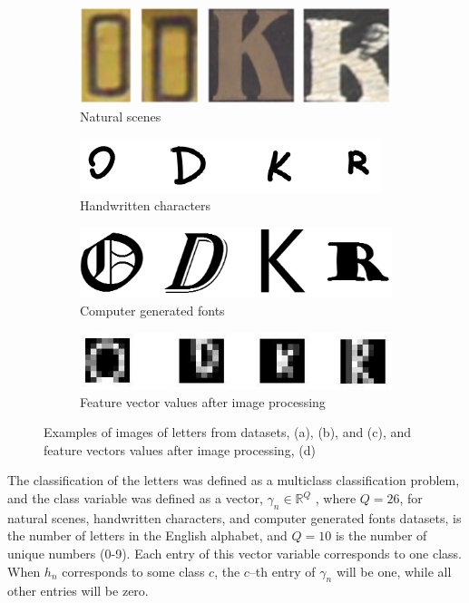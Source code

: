 \documentclass[journal,a4paper,onecolumn,11pt]{IEEEtran}
\begin{document}
\begin{figure}[!h] 
\centering
\begin{subfigure}{.5\textwidth}
  \centering
       \includegraphics[scale=0.5]{natural_images.png}
  \caption{Natural scenes}
    \label{fig:natural_images}
\end{subfigure}%
\begin{subfigure}{.5\textwidth}
\centering
       \includegraphics[scale=.8]{handwritten_char.png}
  \caption{Handwritten characters}
    \label{fig:handwritten_char}
\end{subfigure}
\begin{subfigure}{.5\textwidth}
\centering
       \includegraphics[scale=0.5]{fnt.png}
  \caption{Computer generated fonts}
    \label{fig:fnt}
\end{subfigure}%
\begin{subfigure}{.5\textwidth}
\centering
       \includegraphics[scale=0.6]{processed_char.png}
  \caption{Feature vector values after image processing}
    \label{fig:processed_char}
\end{subfigure}
\caption{Examples of images of letters from datasets, (a), (b), and (c), and feature vectors values after image processing, (d)}
    \label{fig:datasets}
\end{figure}

The classification of the letters was defined as a multiclass classification problem, and the class variable was defined as a vector, $\gamma_n \in \mathbb{R}^{Q}$ , where $Q=26$, for natural scenes, handwritten characters, and computer generated fonts datasets, is the number of letters in the English alphabet, and $Q=10$ is the number of unique numbers (0-9). Each entry of this vector variable corresponds to one class. When $h_n$ corresponds to some class $c$, the $c$--th entry of $\gamma_n$ will be one, while all other entries will be zero.
\end{document}
